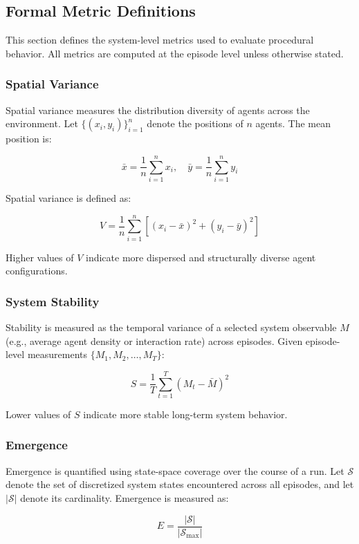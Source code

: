 \subsection{Formal Metric Definitions}

This section defines the system-level metrics used to evaluate procedural behavior. All metrics are computed at the episode level unless otherwise stated.

\subsubsection{Spatial Variance}

Spatial variance measures the distribution diversity of agents across the environment. Let $\{(x_i, y_i)\}_{i=1}^{n}$ denote the positions of $n$ agents. The mean position is:

\[
\bar{x} = \frac{1}{n}\sum_{i=1}^{n} x_i, \quad \bar{y} = \frac{1}{n}\sum_{i=1}^{n} y_i
\]

Spatial variance is defined as:

\[
V = \frac{1}{n}\sum_{i=1}^{n} [(x_i - \bar{x})^2 + (y_i - \bar{y})^2]
\]

Higher values of $V$ indicate more dispersed and structurally diverse agent configurations.

\subsubsection{System Stability}

Stability is measured as the temporal variance of a selected system observable $M$ (e.g., average agent density or interaction rate) across episodes. Given episode-level measurements $\{M_1, M_2, \dots, M_T\}$:

\[
S = \frac{1}{T} \sum_{t=1}^{T} (M_t - \bar{M})^2
\]

Lower values of $S$ indicate more stable long-term system behavior.

\subsubsection{Emergence}

Emergence is quantified using state-space coverage over the course of a run. Let $\mathcal{S}$ denote the set of discretized system states encountered across all episodes, and let $|\mathcal{S}|$ denote its cardinality. Emergence is measured as:

\[
E = \frac{|\mathcal{S}|}{|\mathcal{S}_{\max}|}
\]

